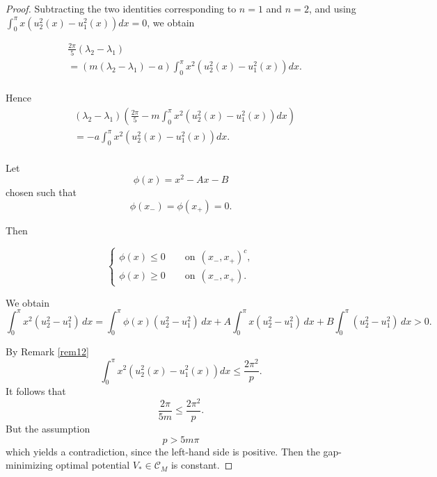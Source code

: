 \documentclass[10pt,a4paper]{amsart}
\begin{document}
\begin{proof}
\noindent  Subtracting the two identities corresponding to $n=1$ and $n=2$, and using $
\int_0^{\pi}x(u_2^2(x)-u_1^2(x))dx =0$, we obtain

\begin{align*}
&  
\frac{2\pi}{5}(\lambda_2-\lambda_1)\\
&=\left(m(\lambda_2-\lambda_1) -a\right)\int_0^{\pi}x^2(u_2^2(x) -u^2_1(x))dx.\\
\end{align*}

\noindent Hence
\begin{align*}
&  
(\lambda_2-\lambda_1)  \left(\frac{2\pi}{5}-m\int_0^{\pi}x^2(u_2^2(x) -u^2_1(x))dx\right)\\
&=-a\int_0^{\pi}x^2(u_2^2(x) -u^2_1(x))dx.\\
\end{align*}


\noindent Let
\[
\phi(x) = x^2 - Ax - B
\]
\noindent chosen such that
\[
\phi(x_-) = \phi(x_+) = 0.
\]

\noindent Then


$$\displaystyle  \left\{%
    \begin{array}{ll}
   
   \phi(x) \leqslant  0 \qquad\text{on}~~(x_-,x_+)^c,
   \\
   \phi(x)\geqslant 0 \qquad\text{on}~~(x_-,x_+).                                                                                      \end{array}                                                                                \right.$$

\noindent We obtain
\[
\int_0^\pi x^2 (u_2^2 - u_1^2)\,dx
= \int_0^\pi \phi(x)(u_2^2 - u_1^2)\,dx
+ A \int_0^\pi x(u_2^2 - u_1^2)\,dx
+ B \int_0^\pi (u_2^2 - u_1^2)\,dx>0.
\]

\noindent By Remark \ref{rem12} \[
\int_0^{\pi}x^2(u_2^2(x) -u^2_1(x))dx\leq\frac{2\pi^2}{p}.
\]
It follows that \[\frac{2\pi}{5m}
\leq 
 \frac{2\pi^2}{p}.
\]
But the assumption
\[
p>5m\pi
\]
which yields a contradiction, since the left-hand side is positive. Then the gap-minimizing
optimal potential $V_{*} \in \mathcal{C}_M $ is constant.
\end{proof}  
\end{document}
